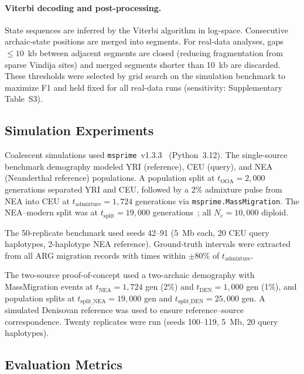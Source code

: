 \paragraph{Viterbi decoding and post-processing.}
State sequences are inferred by the Viterbi algorithm in log-space.
Consecutive archaic-state positions are merged into segments.
For real-data analyses, gaps $\leq 10$~kb between adjacent segments are closed
(reducing fragmentation from sparse Vindija sites) and merged segments shorter
than 10~kb are discarded.
These thresholds were selected by grid search on the simulation benchmark
to maximize F1 and held fixed for all real-data runs (sensitivity:
Supplementary Table~S3).

\subsection*{Simulation Experiments}

Coalescent simulations used \texttt{msprime}~v1.3.3~\citep{baumdicker2022efficient}
(Python~3.12).
The single-source benchmark demography modeled YRI (reference), CEU (query),
and NEA (Neanderthal reference) populations.
A population split at $t_\mathrm{OOA} = 2{,}000$ generations separated YRI and CEU,
followed by a 2\% admixture pulse from NEA into CEU at $t_\mathrm{admixture} = 1{,}724$
generations via \texttt{msprime.MassMigration}.
The NEA--modern split was at $t_\mathrm{split} = 19{,}000$ generations~\citep{prufer2014complete};
all $N_e = 10{,}000$ diploid.

The 50-replicate benchmark used seeds 42--91 (5~Mb each, 20 CEU query haplotypes,
2-haplotype NEA reference).
Ground-truth intervals were extracted from all ARG migration records with times
within $\pm 80\%$ of $t_\mathrm{admixture}$.

The two-source proof-of-concept used a two-archaic demography with
MassMigration events at $t_\mathrm{NEA} = 1{,}724$ gen (2\%) and $t_\mathrm{DEN} = 1{,}000$
gen (1\%), and population splits at $t_\mathrm{split\_NEA} = 19{,}000$ gen and
$t_\mathrm{split\_DEN} = 25{,}000$ gen.
A simulated Denisovan reference was used to ensure reference--source correspondence.
Twenty replicates were run (seeds 100--119, 5~Mb, 20 query haplotypes).

\subsection*{Evaluation Metrics}

